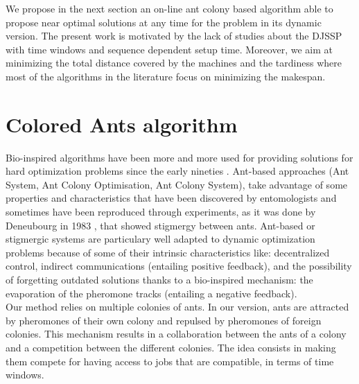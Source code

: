 \documentclass[a4paper,10pt]{article}
\begin{document}
We propose in the next section an on-line ant colony based algorithm able to propose near optimal solutions at any time for the problem in its dynamic version. The present work is motivated by the lack of studies about the DJSSP with time windows and sequence dependent setup time. Moreover, we aim at minimizing the total distance covered by the machines and the tardiness where  most of the algorithms in the literature focus on minimizing the makespan.

\section{Colored Ants algorithm}\label{sec:ants}

Bio-inspired algorithms have been more and more used for providing solutions for hard optimization problems since the early nineties \cite{Dorigo2006}. Ant-based approaches (Ant System, Ant Colony Optimisation, Ant Colony System), take advantage of some properties and characteristics that have been discovered by entomologists and sometimes have been reproduced through experiments, as it was done by Deneubourg in 1983 \cite{Deneubourg1983}, that showed stigmergy between ants. Ant-based or stigmergic systems are particulary well adapted to dynamic optimization problems because of some of their intrinsic characteristics like: decentralized control, indirect communications (entailing positive feedback), and the possibility of forgetting outdated solutions thanks to a bio-inspired mechanism: the evaporation of the pheromone tracks (entailing a negative feedback).\\

Our method relies on multiple colonies of ants. In our version, ants are attracted by pheromones of their own colony and repulsed by pheromones of foreign colonies. This mechanism results in a collaboration between the ants of a colony and a competition between the different colonies. The idea consists in making them compete for having access to jobs that are compatible, in terms of time windows.\\
\end{document}
